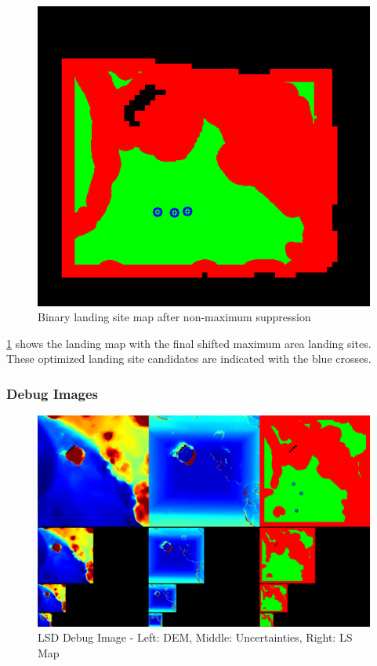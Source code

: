 \begin{figure}[ht!]
    \centering
    \includegraphics[scale=0.5]{images/system_overview/landing_map_marked.png}
    \caption{Binary landing site map after non-maximum suppression}
    \label{fig:ls_map_nps}
\end{figure}

\cref{fig:ls_map_nps} shows the landing map with the final shifted maximum area landing sites. These optimized landing site candidates are indicated with the blue crosses. 

\clearpage %

\subsubsection{Debug Images}

\begin{figure}[ht!]
    \centering
    \includegraphics[scale=0.25]{images/system_overview/lsd_debug_image.png}
    \caption{LSD Debug Image - Left: DEM, Middle: Uncertainties, Right: LS Map}
    \label{fig:lsd_debug} %
\end{figure}

